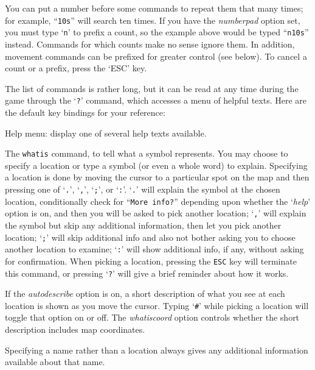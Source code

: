 \documentclass[titlepage]{article}
\begin{document}
You can put a number before some commands to repeat them that many
times; for example, ``\texttt{10s}'' will search ten times.  If you have the
\textit{number\textunderscore pad}
option set, you must type `\texttt{n}' to prefix a count, so the example above
would be typed ``\texttt{n10s}'' instead.  Commands for which counts make no
sense ignore them.  In addition, movement commands can be prefixed for
greater control (see below).  To cancel a count or a prefix, press the
`ESC' key.

The list of commands is rather long, but it can be read at any time
during the game through the `\texttt{?}' command, which accesses a menu of
helpful texts.  Here are the default key bindings for your reference:

\begin{description}[font=\mdseries\ttfamily]
\item[?]
Help menu:  display one of several help texts available.
\item[/]
The \texttt{whatis} command, to
tell what a symbol represents.  You may choose to specify a location
or type a symbol (or even a whole word) to explain.
Specifying a location is done by moving the cursor to a particular spot
on the map and then pressing one of `\texttt{.}', `\texttt{,}', `\texttt{;}',
or `\texttt{:}'.  `\texttt{.}' will explain the symbol at the chosen location,
conditionally check for ``\texttt{More info?}'' depending upon whether the
`\textit{help}'
option is on, and then you will be asked to pick another location;
`\texttt{,}' will explain the symbol but skip any additional
information, then let you pick another location;
`\texttt{;}' will skip additional info and also not bother asking
you to choose another location to examine; `\texttt{:}' will show additional
info, if any, without asking for confirmation.  When picking a location,
pressing the \texttt{ESC} key will terminate this command, or pressing `\texttt{?}'
will give a brief reminder about how it works.

If the
\textit{autodescribe}
option is on, a short description of what you see at each location is
shown as you move the cursor.  Typing `\texttt{\#}' while picking a location will
toggle that option on or off.
The
\textit{whatis\textunderscore coord}
option controls whether the short description includes map coordinates.

Specifying a name rather than a location
always gives any additional information available about that name.


\end{description}
\end{document}
